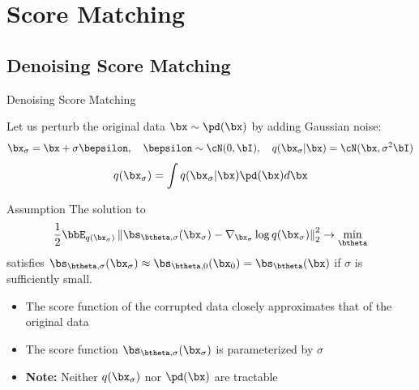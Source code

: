 \documentclass{beamer}
\begin{document}
\section{Score Matching}
\subsection{Denoising Score Matching}
\begin{frame}{Denoising Score Matching}

	Let us perturb the original data $\bx \sim \pd(\bx)$ by adding Gaussian noise:
	\vspace{-0.3cm}
	\[
		\bx_{\sigma} = \bx + \sigma \bepsilon, \quad \bepsilon \sim \cN(0, \bI), \quad q(\bx_{\sigma} | \bx) = \cN(\bx, \sigma^2 \bI)
	\]
	\vspace{-0.5cm}
	\[
		q(\bx_{\sigma}) = \int q(\bx_{\sigma} | \bx) \pd(\bx) d\bx
	\]
    \eqpause
	\vspace{-0.5cm} 
	\begin{block}{Assumption}
		The solution to
		\[
			\frac{1}{2} \bbE_{q(\bx_{\sigma})}\left\| \bs_{\btheta, \sigma}(\bx_{\sigma}) - \nabla_{\bx_{\sigma}} \log q(\bx_{\sigma}) \right\|_2^2 \rightarrow \min_{\btheta}
		\]
		\vspace{-0.3cm}
		satisfies $\bs_{\btheta, \sigma}(\bx_{\sigma}) \approx \bs_{\btheta, 0}(\bx_0) = \bs_{\btheta}(\bx)$ if $\sigma$ is sufficiently small.
	\end{block}
    \eqpause
	\begin{itemize}
		\item The score function of the corrupted data closely approximates that of the original data
		\item The score function $\bs_{\btheta, \sigma}(\bx_{\sigma})$ is parameterized by $\sigma$
		\item \textbf{Note:} Neither $q(\bx_{\sigma})$ nor $\pd(\bx)$ are tractable
	\end{itemize}
\end{frame}
\end{document}
